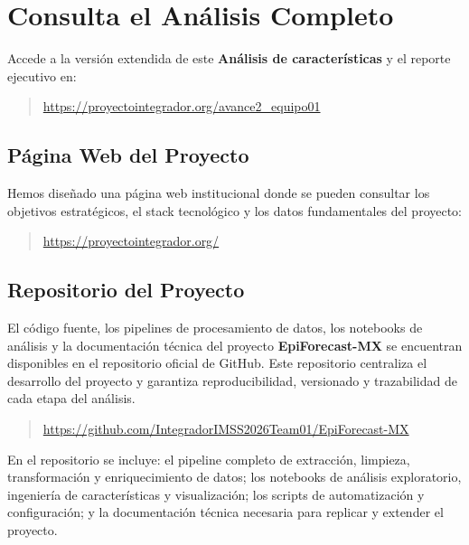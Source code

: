 \documentclass[12pt,letterpaper]{article}
\begin{document}
\vfill
\newpage

\section*{Consulta el Análisis Completo}

Accede a la versión extendida de este \textbf{Análisis de características} y el reporte ejecutivo en:

\begin{quote}
\url{https://proyectointegrador.org/avance2_equipo01}
\end{quote}

\subsection*{Página Web del Proyecto}

Hemos diseñado una página web institucional donde se pueden consultar los objetivos estratégicos, el stack tecnológico y los datos fundamentales del proyecto:

\begin{quote}
\url{https://proyectointegrador.org/}
\end{quote}

\subsection*{Repositorio del Proyecto}

El código fuente, los pipelines de procesamiento de datos, los notebooks de análisis y la documentación técnica del proyecto \textbf{EpiForecast-MX} se encuentran disponibles en el repositorio oficial de GitHub. Este repositorio centraliza el desarrollo del proyecto y garantiza reproducibilidad, versionado y trazabilidad de cada etapa del análisis.

\begin{quote}
\url{https://github.com/IntegradorIMSS2026Team01/EpiForecast-MX}
\end{quote}

En el repositorio se incluye: el pipeline completo de extracción, limpieza, transformación y enriquecimiento de datos; los notebooks de análisis exploratorio, ingeniería de características y visualización; los scripts de automatización y configuración; y la documentación técnica necesaria para replicar y extender el proyecto.
\end{document}
